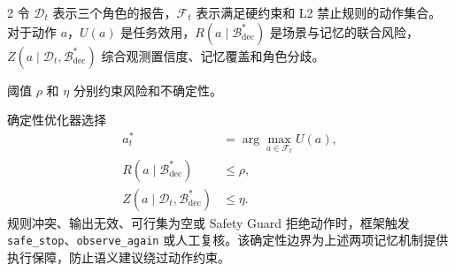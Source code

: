 \documentclass[10pt]{article}
\newcommand{\code}[1]{\texttt{#1}}
\newcounter{algo}
\begin{document}
\begin{multicols}{2}
令 $\mathcal{D}_t$ 表示三个角色的报告，$\mathcal{F}_t$ 表示满足硬约束和 L2 禁止规则的动作集合。对于动作 $a$，$U(a)$ 是任务效用，$R(a\mid\mathcal{B}_{\mathrm{dec}}^*)$ 是场景与记忆的联合风险，$Z(a\mid\mathcal{D}_t,\mathcal{B}_{\mathrm{dec}}^*)$ 综合观测置信度、记忆覆盖和角色分歧。

阈值 $\rho$ 和 $\eta$ 分别约束风险和不确定性。

\columnbreak
确定性优化器选择
\begin{equation}
\begin{aligned}
a_t^*&=\arg\max_{a\in\mathcal{F}_t}U(a),\\
R(a\mid\mathcal{B}_{\mathrm{dec}}^*)&\leq\rho,\\
Z(a\mid\mathcal{D}_t,\mathcal{B}_{\mathrm{dec}}^*)&\leq\eta.
\end{aligned}
\label{eq:decision-zh}
\end{equation}
规则冲突、输出无效、可行集为空或 Safety Guard 拒绝动作时，框架触发 \code{safe\_stop}、\code{observe\_again} 或人工复核。该确定性边界为上述两项记忆机制提供执行保障，防止语义建议绕过动作约束。

\begin{center}
\end{center}

\end{multicols}
\end{document}
